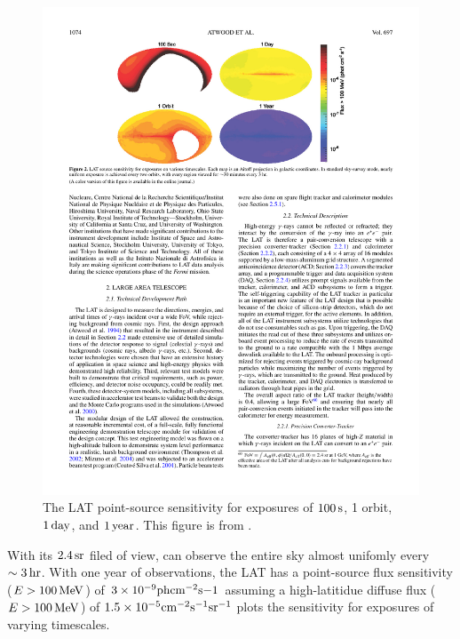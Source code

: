 \begin{figure}[htbp]
  \centering
  \includegraphics{chapters/introduction/figures/lat_point_source_sensitivity.pdf}
  \caption{
  The \ac{LAT} point-source sensitivity for exposures of
  $100\,\text{s}$, 1 orbit, $1\,\text{day}$,
  and $1\,\text{year}$.  This figure is from
  \cite{atwood_2009a_large-telescope}.
  }
\end{figure} 


With its $2.4\,\text{sr}$ filed of view, \fermi can observe
the entire sky almost unifomly every $\sim3\,\text{hr}$.
With one year of observations, the \ac{LAT} has a point-source
flux sensitivity ($E>100\,\text{MeV}$) of $3 \times 10^{-9}
\text{ph} \text{cm}^{-2}\text{s}{-1}$ assuming a high-latitidue diffuse flux
($E>100\,\text{MeV}$) of $1.5\times10^{-5}\text{cm}^{-2}\text{s}^{-1}\text{sr}^{-1}$
 plots the sensitivity
for exposures of varying timescales.



